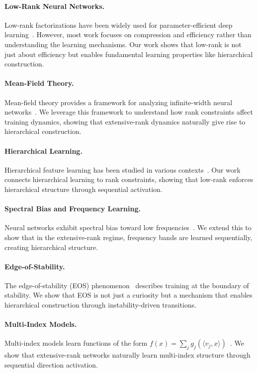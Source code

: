 \paragraph{Low-Rank Neural Networks.}
Low-rank factorizations have been widely used for parameter-efficient deep learning~\cite{arora2018optimization,novikov2015tensorizing}. However, most work focuses on compression and efficiency rather than understanding the learning mechanisms. Our work shows that low-rank is not just about efficiency but enables fundamental learning properties like hierarchical construction.

\paragraph{Mean-Field Theory.}
Mean-field theory provides a framework for analyzing infinite-width neural networks~\cite{mei2018mean,chizat2018global,rotskoff2018neural}. We leverage this framework to understand how rank constraints affect training dynamics, showing that extensive-rank dynamics naturally give rise to hierarchical construction.

\paragraph{Hierarchical Learning.}
Hierarchical feature learning has been studied in various contexts~\cite{zeiler2014visualizing,olah2017feature}. Our work connects hierarchical learning to rank constraints, showing that low-rank enforces hierarchical structure through sequential activation.

\paragraph{Spectral Bias and Frequency Learning.}
Neural networks exhibit spectral bias toward low frequencies~\cite{rahaman2019spectral,xu2019training}. We extend this to show that in the extensive-rank regime, frequency bands are learned sequentially, creating hierarchical structure.

\paragraph{Edge-of-Stability.}
The edge-of-stability (EOS) phenomenon~\cite{cohen2021gradient} describes training at the boundary of stability. We show that EOS is not just a curiosity but a mechanism that enables hierarchical construction through instability-driven transitions.

\paragraph{Multi-Index Models.}
Multi-index models learn functions of the form $f(x) = \sum_j g_j(\langle v_j, x \rangle)$~\cite{benarous2021online}. We show that extensive-rank networks naturally learn multi-index structure through sequential direction activation.
